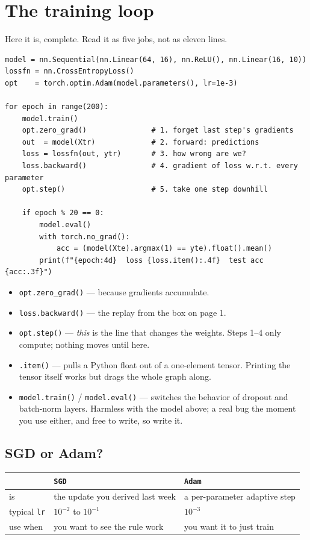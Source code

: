 \documentclass[11pt]{article}
\begin{document}
\section{The training loop}

Here it is, complete. Read it as five jobs, not as eleven lines.

\begin{lstlisting}
model = nn.Sequential(nn.Linear(64, 16), nn.ReLU(), nn.Linear(16, 10))
lossfn = nn.CrossEntropyLoss()
opt    = torch.optim.Adam(model.parameters(), lr=1e-3)

for epoch in range(200):
    model.train()
    opt.zero_grad()               # 1. forget last step's gradients
    out  = model(Xtr)             # 2. forward: predictions
    loss = lossfn(out, ytr)       # 3. how wrong are we?
    loss.backward()               # 4. gradient of loss w.r.t. every parameter
    opt.step()                    # 5. take one step downhill

    if epoch % 20 == 0:
        model.eval()
        with torch.no_grad():
            acc = (model(Xte).argmax(1) == yte).float().mean()
        print(f"{epoch:4d}  loss {loss.item():.4f}  test acc {acc:.3f}")
\end{lstlisting}

\begin{itemize}
  \item \texttt{opt.zero\_grad()} --- because gradients accumulate.
  \item \texttt{loss.backward()} --- the replay from the box on page 1.
  \item \texttt{opt.step()} --- \emph{this} is the line that changes the weights.
        Steps 1--4 only compute; nothing moves until here.
  \item \texttt{.item()} --- pulls a Python float out of a one-element tensor.
        Printing the tensor itself works but drags the whole graph along.
  \item \texttt{model.train()} / \texttt{model.eval()} --- switches the behavior
        of dropout and batch-norm layers. Harmless with the model above; a real
        bug the moment you use either, and free to write, so write it.
\end{itemize}

\subsection{SGD or Adam?}

\begin{center}
\begin{tabular}{@{}lll@{}}
\toprule
& \texttt{SGD} & \texttt{Adam} \\
\midrule
is & the update you derived last week & a per-parameter adaptive step \\
typical \texttt{lr} & $10^{-2}$ to $10^{-1}$ & $10^{-3}$ \\
use when & you want to see the rule work & you want it to just train \\
\bottomrule
\end{tabular}
\end{center}
\end{document}
